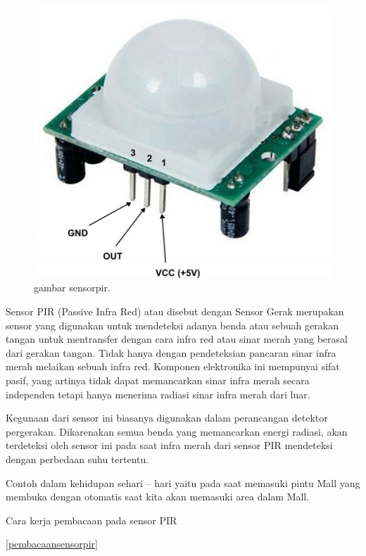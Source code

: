 \begin{figure}[ht]
\centerline{\includegraphics[width=1\textwidth]{figures/sensorpir.JPG}}
\caption{gambar sensorpir.}
\label{sensorpir.JPG}
\end{figure}

Sensor PIR (Passive Infra Red) atau disebut dengan Sensor Gerak merupakan sensor yang digunakan untuk mendeteksi adanya benda atau sebuah gerakan tangan untuk mentransfer dengan cara infra red atau sinar merah yang berasal dari gerakan tangan. Tidak hanya dengan pendeteksian pancaran sinar infra merah melaikan sebuah infra red.
Komponen elektronika ini mempunyai sifat pasif, yang artinya tidak dapat memancarkan sinar infra merah secara independen tetapi hanya menerima radiasi sinar infra merah dari luar.

Kegunaan dari sensor ini biasanya digunakan dalam perancangan detektor pergerakan. Dikarenakan semua benda yang memancarkan energi radiasi, akan terdeteksi oleh sensor ini pada saat infra merah dari sensor PIR mendeteksi dengan perbedaan suhu tertentu.

Contoh dalam kehidupan sehari – hari yaitu pada saat memasuki pintu Mall yang membuka dengan otomatis saat kita akan memasuki area dalam Mall.

Cara kerja pembacaan pada sensor PIR

\ref{pembacaansensorpir}

